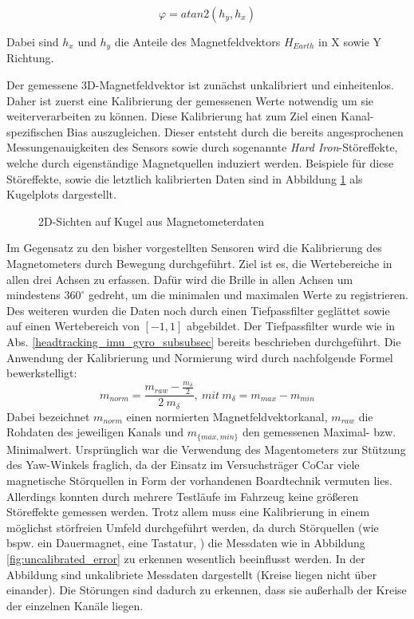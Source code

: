 \begin{equation}
    \varphi = atan2(h_y,h_x)
\end{equation}

Dabei sind $h_x$ und $h_y$ die Anteile des Magnetfeldvektors $H_{Earth}$ in X sowie Y Richtung.

Der gemessene 3D-Magnetfeldvektor ist zunächst unkalibriert und einheitenlos.
Daher ist zuerst eine Kalibrierung der gemessenen Werte notwendig um sie weiterverarbeiten zu können. 
Diese Kalibrierung hat zum Ziel einen Kanal-spezifischen Bias auszugleichen. 
Dieser entsteht durch die bereits angesprochenen Messungenauigkeiten des Sensors sowie durch sogenannte \textit{Hard Iron}-Störeffekte, welche durch eigenständige Magnetquellen induziert werden.
Beispiele für diese Störeffekte, sowie die letztlich kalibrierten Daten sind in Abbildung \ref{fig:mag_kugel_plots} als Kugelplots dargestellt.

\begin{figure}[ht]
\centering
{}

\caption[]{2D-Sichten auf Kugel aus Magnetometerdaten}
\label{fig:mag_kugel_plots}
\end{figure}

Im Gegensatz zu den bisher vorgestellten Sensoren wird die Kalibrierung des Magnetometers durch Bewegung durchgeführt.
Ziel ist es, die Wertebereiche in allen drei Achsen zu erfassen.
Dafür wird die Brille in allen Achsen um mindestens $360^\circ$ gedreht, um die minimalen und maximalen Werte zu registrieren. 
Des weiteren wurden die Daten noch durch einen Tiefpassfilter geglättet sowie auf einen Wertebereich von $[-1,1]$ abgebildet.
 Der Tiefpassfilter wurde wie in Abs. \ref{headtracking_imu_gyro_subsubsec} bereits beschrieben durchgeführt. 
Die Anwendung der Kalibrierung und Normierung wird durch nachfolgende Formel bewerkstelligt:
\begin{equation}
    m_{norm} = \frac{m_{raw}- \frac{m_{\delta}}{2}}{2~m_{\delta}},~mit ~m_{\delta} = m_{max} - m_{min}
\end{equation}
Dabei bezeichnet $m_{norm}$ einen normierten Magnetfeldvektorkanal, $m_{raw}$ die Rohdaten des jeweiligen Kanals und $m_{\lbrace max, min\rbrace}$ den gemessenen Maximal- bzw. Minimalwert.
Ursprünglich war die Verwendung des Magentometers zur Stützung des Yaw-Winkels fraglich, da der Einsatz im Versuchsträger CoCar viele magnetische Störquellen in Form der vorhandenen Boardtechnik vermuten lies. 
Allerdings konnten durch mehrere Testläufe im Fahrzeug keine größeren Störeffekte gemessen werden.
Trotz allem muss eine Kalibrierung in einem möglichst störfreien Umfeld durchgeführt werden, da durch Störquellen (wie bspw. ein Dauermagnet, eine Tastatur, \oae) die Messdaten wie in Abbildung \ref{fig:uncalibrated_error} zu erkennen wesentlich beeinflusst werden. In der Abbildung sind unkalibriete Messdaten dargestellt (Kreise liegen nicht über einander). Die Störungen sind dadurch zu erkennen, dass sie außerhalb der Kreise der einzelnen Kanäle liegen.

